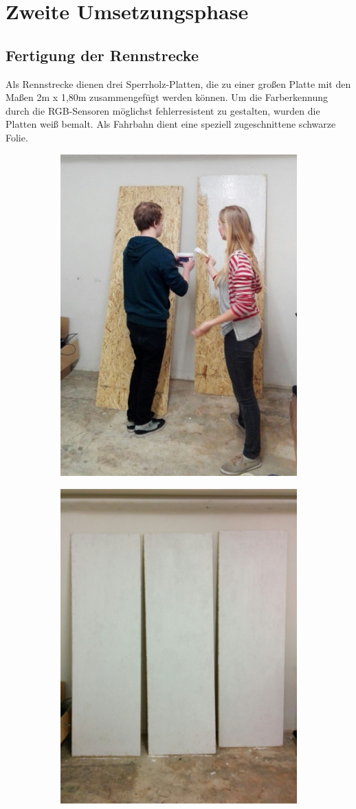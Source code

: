 \documentclass[a4paper,12pt]{article}                                         %
\numberwithin{table}{section}                               %
\numberwithin{figure}{section}                              %
\begin{document}
	\newpage
	\section{Zweite Umsetzungsphase}
	\subsection{Fertigung der Rennstrecke}
	Als Rennstrecke dienen drei Sperrholz-Platten, die zu einer großen Platte mit den Maßen 2m x 1,80m zusammengefügt werden können. Um die Farberkennung durch die RGB-Sensoren möglichst fehlerresistent zu gestalten, wurden die Platten weiß bemalt. Als Fahrbahn dient eine speziell zugeschnittene schwarze Folie.
	
	\begin{figure}[h!]
	\centering
	\begin{subfigure}{.5\textwidth}
	  \centering
	  \includegraphics[width=.6\linewidth]{../Bilder/plattenmalen.jpg}
	  \label{fig:sub1}
	\end{subfigure}%
	\begin{subfigure}{.5\textwidth}
	  \centering
	  \includegraphics[width=.6\linewidth]{../Bilder/plattenfertig.jpg}

\end{subfigure}
\end{figure}
\end{document}
